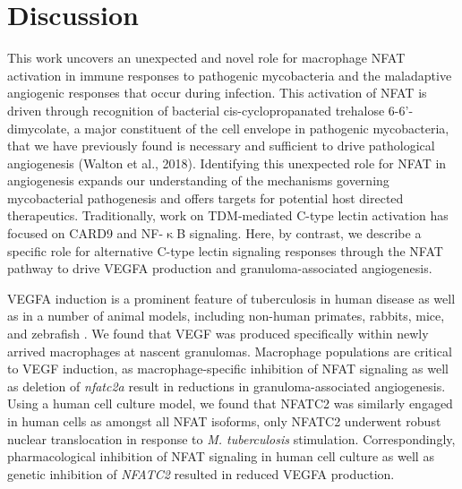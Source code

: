\section{Discussion}\label{pap:disc}

This work uncovers an unexpected and novel role for macrophage NFAT activation in immune responses to pathogenic mycobacteria and the maladaptive angiogenic responses that occur during infection. This activation of NFAT is driven through recognition of bacterial cis\hyp{}cyclopropanated trehalose 6\hyp{}6'\hyp{}dimycolate, a major constituent of the cell envelope in pathogenic mycobacteria, that we have previously found is necessary and sufficient to drive pathological angiogenesis (Walton et al., 2018). Identifying this unexpected role for NFAT in angiogenesis expands our understanding of the mechanisms governing mycobacterial pathogenesis and offers targets for potential host directed therapeutics. Traditionally, work on TDM-mediated C-type lectin activation has focused on CARD9 and NF-$\upkappa$B signaling. Here, by contrast, we describe a specific role for alternative C-type lectin signaling responses through the NFAT pathway to drive VEGFA production and granuloma-associated angiogenesis. 

VEGFA induction is a prominent feature of tuberculosis in human disease as well as in a number of animal models, including non-human primates, rabbits, mice, and zebrafish \citep{Datta2015, Oehlers2015, Polena2016, Harding2019, Cronan2021, Gideon2022}. We found that VEGF was produced specifically within newly arrived macrophages at nascent granulomas. Macrophage populations are critical to VEGF induction, as macrophage-specific inhibition of NFAT signaling as well as deletion of \textit{nfatc2a} result in reductions in granuloma-associated angiogenesis. Using a human cell culture model, we found that NFATC2 was similarly engaged in human cells as amongst all NFAT isoforms, only NFATC2 underwent robust nuclear translocation in response to \textit{M. tuberculosis} stimulation. Correspondingly, pharmacological inhibition of NFAT signaling in human cell culture as well as genetic inhibition of \textit{NFATC2} resulted in reduced VEGFA production.

